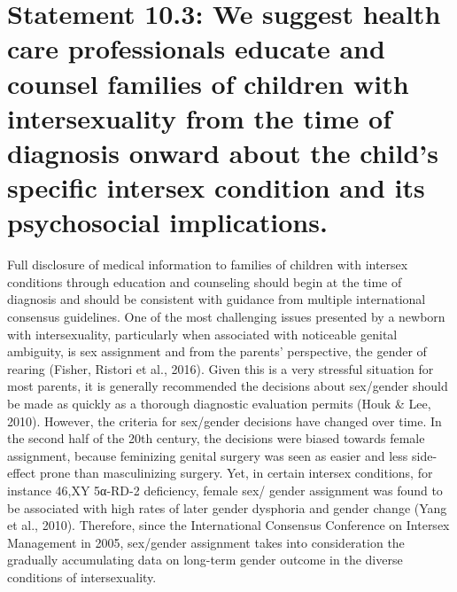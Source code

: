 \documentclass[
]{book}
\begin{document}
\hypertarget{statement-10.3-we-suggest-health-care-professionals-educate-and-counsel-families-of-children-with-intersexuality-from-the-time-of-diagnosis-onward-about-the-childs-specific-intersex-condition-and-its-psychosocial-implications.}{%
\section*{Statement 10.3: We suggest health care professionals educate and counsel families of children with intersexuality from the time of diagnosis onward about the child's specific intersex condition and its psychosocial implications.}\label{statement-10.3-we-suggest-health-care-professionals-educate-and-counsel-families-of-children-with-intersexuality-from-the-time-of-diagnosis-onward-about-the-childs-specific-intersex-condition-and-its-psychosocial-implications.}}

Full disclosure of medical information to families of children with intersex conditions through
education and counseling should begin at the time
of diagnosis and should be consistent with guidance from multiple international consensus guidelines. One of the most challenging issues presented
by a newborn with intersexuality, particularly
when associated with noticeable genital ambiguity,
is sex assignment and from the parents' perspective, the gender of rearing (Fisher, Ristori et al.,
2016). Given this is a very stressful situation for
most parents, it is generally recommended the
decisions about sex/gender should be made as
quickly as a thorough diagnostic evaluation permits (Houk \& Lee, 2010). However, the criteria
for sex/gender decisions have changed over time.
In the second half of the 20th century, the decisions were biased towards female assignment,
because feminizing genital surgery was seen as
easier and less side-effect prone than masculinizing surgery. Yet, in certain intersex conditions, for
instance 46,XY 5α-RD-2 deficiency, female sex/
gender assignment was found to be associated with
high rates of later gender dysphoria and gender
change (Yang et al., 2010). Therefore, since the
International Consensus Conference on Intersex
Management in 2005, sex/gender assignment takes
into consideration the gradually accumulating data
on long-term gender outcome in the diverse conditions of intersexuality.
\end{document}
